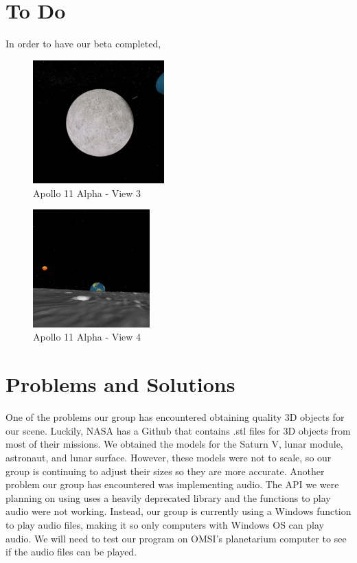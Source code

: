 \documentclass[onecolumn, draftclsnofoot,10pt, compsoc]{IEEEtran}
\begin{document}
\section{To Do}
In order to have our beta completed, 

\begin{figure}
    \includegraphics[width=0.45\textwidth, left]{View3.PNG} 
    \caption{Apollo 11 Alpha - View 3}
    \label{fig:View 3}
\end{figure}

\begin{figure}
    \includegraphics[width=0.4\textwidth, right]{View4.PNG} 
    \caption{Apollo 11 Alpha - View 4}
    \label{fig:View 4}
\end{figure}





\section{Problems and Solutions}
One of the problems our group has encountered obtaining quality 3D objects for our scene. Luckily, NASA has a Github that contains .stl files for 3D objects from most of their missions. We obtained the models for the Saturn V, lunar module, astronaut, and lunar surface. However, these models were not to scale, so our group is continuing to adjust their sizes so they are more accurate. Another problem our group has encountered was implementing audio. The API we were planning on using uses a heavily deprecated library and the functions to play audio were not working. Instead, our group is currently using a Windows function to play audio files, making it so only computers with Windows OS can play audio. We will need to test our program on OMSI's planetarium computer to see if the audio files can be played. 
\end{document}
